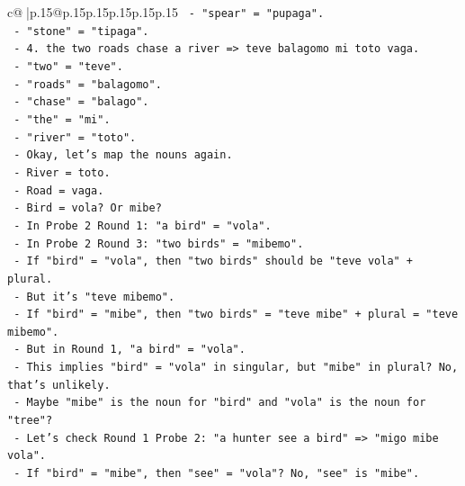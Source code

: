 \documentclass{article}
\begin{document}
{\begin{supertabular}{c@{$\;$}|p{.15\linewidth}@{}p{.15\linewidth}p{.15\linewidth}p{.15\linewidth}p{.15\linewidth}p{.15\linewidth}}
{{{\texttt{                            {-} "spear" = "pupaga".} \\
\texttt{                            {-} "stone" = "tipaga".} \\
\texttt{                          {-} 4. the two roads chase a river => teve balagomo mi toto vaga.} \\
\texttt{                            {-} "two" = "teve".} \\
\texttt{                            {-} "roads" = "balagomo".} \\
\texttt{                            {-} "chase" = "balago".} \\
\texttt{                            {-} "the" = "mi".} \\
\texttt{                            {-} "river" = "toto".} \\
\texttt{                      {-} Okay, let's map the nouns again.} \\
\texttt{                        {-} River = toto.} \\
\texttt{                        {-} Road = vaga.} \\
\texttt{                        {-} Bird = vola? Or mibe?} \\
\texttt{                          {-} In Probe 2 Round 1: "a bird" = "vola".} \\
\texttt{                          {-} In Probe 2 Round 3: "two birds" = "mibemo".} \\
\texttt{                          {-} If "bird" = "vola", then "two birds" should be "teve vola" + plural.} \\
\texttt{                          {-} But it's "teve mibemo".} \\
\texttt{                          {-} If "bird" = "mibe", then "two birds" = "teve mibe" + plural = "teve mibemo".} \\
\texttt{                          {-} But in Round 1, "a bird" = "vola".} \\
\texttt{                          {-} This implies "bird" = "vola" in singular, but "mibe" in plural? No, that's unlikely.} \\
\texttt{                          {-} Maybe "mibe" is the noun for "bird" and "vola" is the noun for "tree"?} \\
\texttt{                          {-} Let's check Round 1 Probe 2: "a hunter see a bird" => "migo mibe vola".} \\
\texttt{                            {-} If "bird" = "mibe", then "see" = "vola"? No, "see" is "mibe".} \\
}}}
\end{supertabular}}
\end{document}
